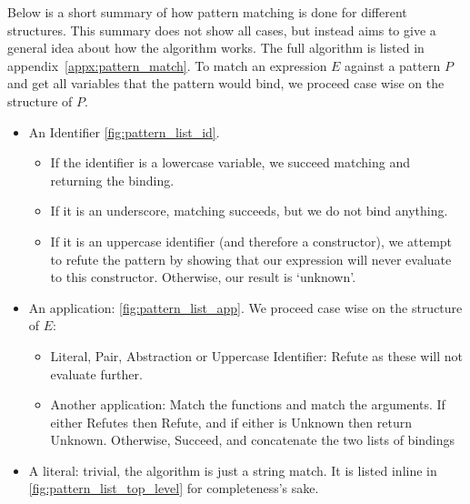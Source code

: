 Below is a short summary of how pattern matching is done for different structures. This summary does not show all cases, but instead aims to give a general idea about how the algorithm works. The full algorithm is listed in appendix~\ref{appx:pattern_match}. To match an expression $E$ against a pattern $P$ and get all variables that the pattern would bind, we proceed case wise on the structure of $P$. 
\begin{itemize}
    \item An Identifier \ref{fig:pattern_list_id}. 
    \begin{itemize}
        \item If the identifier is a lowercase variable, we succeed matching and returning the binding.
        \item If it is an underscore, matching succeeds, but we do not bind anything. 
        \item If it is an uppercase identifier (and therefore a constructor), we attempt to refute the pattern by showing that our expression will never evaluate to this constructor. Otherwise, our result is `unknown'.
    \end{itemize}

    
    \item An application: \ref{fig:pattern_list_app}. We proceed case wise on the structure of $E$:
    \begin{itemize}
        \item Literal, Pair, Abstraction or Uppercase Identifier: Refute as these will not evaluate further.
        \item Another application: Match the functions and match the arguments. If either Refutes then Refute, and if either is Unknown then return Unknown. Otherwise, Succeed, and concatenate the two lists of bindings
    \end{itemize} 

    \item A literal: trivial, the algorithm is just a string match. It is listed inline in \ref{fig:pattern_list_top_level} for completeness's sake. 
\end{itemize}

